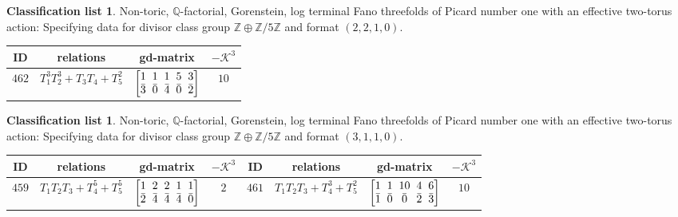 \documentclass[10pt,a4paper]{amsart}
\theoremstyle{definition}
\newtheorem{class-list}[thm]{Classification list}
\def\ZZ{{\mathbb Z}}
\def\QQ{{\mathbb Q}}
\numberwithin{equation}{section}
\begin{document}
\begin{class-list}\label{class-list(0,5)}
Non-toric, $\QQ$-factorial, Gorenstein, log terminal Fano
threefolds of Picard number one with an effective two-torus action:
Specifying data for divisor class group $\ZZ\oplus \ZZ/5\ZZ$ and
format $(2,2,1,0)$.
\begin{table}[h!]\centering\setlength{\tabcolsep}{5.5pt}
\renewcommand{\arraystretch}{1.15}\small\tabulinesep=1mm
\begin{tabu}{c|c|c|c}
\hline
ID&relations&gd-matrix&$-\mathcal{K}^3$
\\
\hline
${462}$&${T_{1}^{3}T_{2}^{3}+T_{3}T_{4}+T_{5}^{2}}$
&$\arraycolsep=1mm\begin{bmatrix}{1} & {1} & {1} & {5} & {3} \\ {\bar{3}} & {\bar{0}} & {\bar{4}} & {\bar{0}} & {\bar{2}}\end{bmatrix}$&${10}$
\\
\hline
\end{tabu}%
\end{table}
\end{class-list}


\begin{class-list}
Non-toric, $\QQ$-factorial, Gorenstein, log terminal Fano
threefolds of Picard number one with an effective two-torus action:
Specifying data for divisor class group $\ZZ\oplus \ZZ/5\ZZ$ and
format $(3,1,1,0)$.
\begin{table}[h!]\centering\setlength{\tabcolsep}{3.5pt}
\renewcommand{\arraystretch}{1.15}\small\tabulinesep=1mm
\begin{tabu}{c|c|c|c||c|c|c|c}
\hline
ID&relations&gd-matrix&$-\mathcal{K}^3$&ID&relations&gd-matrix&$-\mathcal{K}^3$
\\
\hline
${459}$&${T_{1}T_{2}T_{3}+T_{4}^{5}+T_{5}^{5}}$
&$\arraycolsep=1mm\begin{bmatrix}{1} & {2} & {2} & {1} & {1} \\ {\bar{2}} & {\bar{4}} & {\bar{4}} & {\bar{4}} & {\bar{0}}\end{bmatrix}$&${2}$
&${461}$&${T_{1}T_{2}T_{3}+T_{4}^{3}+T_{5}^{2}}$
&$\arraycolsep=1mm\begin{bmatrix}{1} & {1} & {10} & {4} & {6} \\ {\bar{1}} & {\bar{0}} & {\bar{0}} & {\bar{2}} & {\bar{3}}\end{bmatrix}$&${10}$
\\
\hline
\end{tabu}%
\end{table}
\end{class-list}
\end{document}
